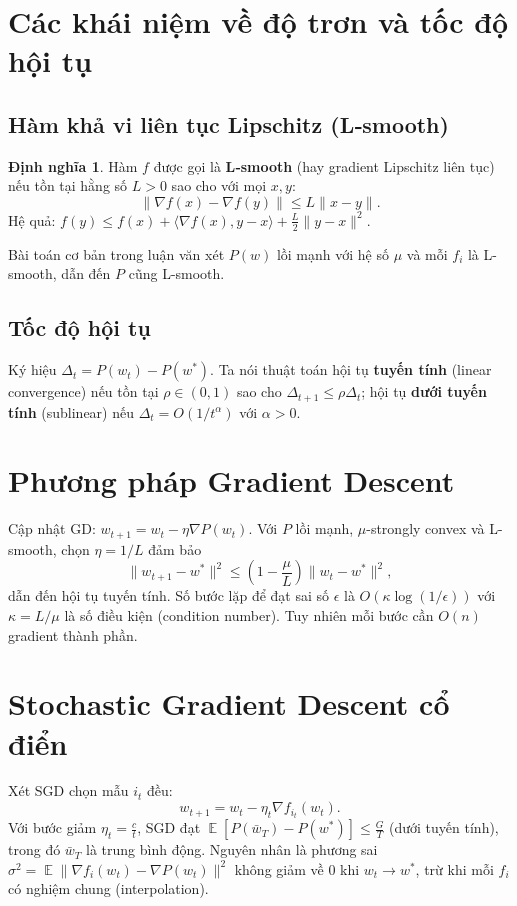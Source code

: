 \documentclass[12pt,a4paper]{report}
\theoremstyle{definition}
\newtheorem{definition}{Định nghĩa}[chapter]
\DeclareMathOperator*{\E}{\mathbb{E}}
\begin{document}
\section{Các khái niệm về độ trơn và tốc độ hội tụ}
\subsection{Hàm khả vi liên tục Lipschitz (L‑smooth)}
\begin{definition}
Hàm $f$ được gọi là \textbf{L‑smooth} (hay gradient Lipschitz liên tục) nếu tồn tại hằng số $L>0$ sao cho với mọi $x,y$:
\begin{equation}
\|\nabla f(x) - \nabla f(y)\| \le L \|x-y\|.
\end{equation}
Hệ quả: $f(y) \le f(x) + \langle \nabla f(x), y-x \rangle + \frac{L}{2}\|y-x\|^2$.
\end{definition}
Bài toán cơ bản trong luận văn xét $P(w)$ lồi mạnh với hệ số $\mu$ và mỗi $f_i$ là L-smooth, dẫn đến $P$ cũng L-smooth.

\subsection{Tốc độ hội tụ}
Ký hiệu $\Delta_t = P(w_t) - P(w^*)$. Ta nói thuật toán hội tụ \textbf{tuyến tính} (linear convergence) nếu tồn tại $\rho \in (0,1)$ sao cho $\Delta_{t+1} \le \rho \Delta_t$; hội tụ \textbf{dưới tuyến tính} (sublinear) nếu $\Delta_t = O(1/t^\alpha)$ với $\alpha>0$.

\section{Phương pháp Gradient Descent}
Cập nhật GD: $w_{t+1} = w_t - \eta \nabla P(w_t)$. Với $P$ lồi mạnh, $\mu$-strongly convex và L-smooth, chọn $\eta = 1/L$ đảm bảo
\begin{equation}
\|w_{t+1} - w^*\|^2 \le \left(1 - \frac{\mu}{L}\right) \|w_t - w^*\|^2,
\end{equation}
dẫn đến hội tụ tuyến tính. Số bước lặp để đạt sai số $\epsilon$ là $O(\kappa \log(1/\epsilon))$ với $\kappa = L/\mu$ là số điều kiện (condition number). Tuy nhiên mỗi bước cần $O(n)$ gradient thành phần.

\section{Stochastic Gradient Descent cổ điển}
Xét SGD chọn mẫu $i_t$ đều:
\begin{equation}
w_{t+1} = w_t - \eta_t \nabla f_{i_t}(w_t).
\end{equation}
Với bước giảm $\eta_t = \frac{c}{t}$, SGD đạt $\E[P(\bar{w}_T) - P(w^*)] \le \frac{G}{T}$ (dưới tuyến tính), trong đó $\bar{w}_T$ là trung bình động. Nguyên nhân là phương sai $\sigma^2 = \E\|\nabla f_i(w_t) - \nabla P(w_t)\|^2$ không giảm về 0 khi $w_t \to w^*$, trừ khi mỗi $f_i$ có nghiệm chung (interpolation).
\end{document}
